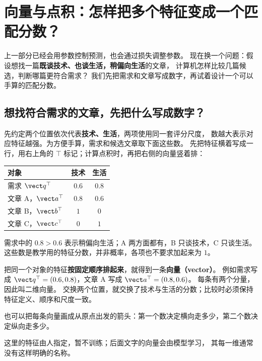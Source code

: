 \chapterrule
\section{向量与点积：怎样把多个特征变成一个匹配分数？}
\label{intro:01-vectors}
\label{intro:02-dot-product}

上一部分已经会用参数控制预测，也会通过损失调整参数。
现在换一个问题：假设想找一篇\textbf{既谈技术、也谈生活，稍偏向生活}的文章，
计算机怎样比较几篇候选，判断哪篇更符合需求？
我们先把需求和文章写成数字，再试着设计一个可以手算的匹配分数。

\subsection{想找符合需求的文章，先把什么写成数字？}

先约定两个位置依次代表\textbf{技术、生活}，两项使用同一套评分尺度，
数越大表示对应特征越强。为方便手算，需求和候选文章取下面这些数。
先把特征横着写成一行，用右上角的 $\top$ 标记；计算点积时，再把右侧的向量竖着排：
\begin{center}
\begin{tabular}{@{}lcc@{}}\toprule
对象 & 技术 & 生活\\\midrule
需求 $\vect q^\top$ & $0.6$ & $0.8$\\
文章 A，$\vect a^\top$ & $0.8$ & $0.6$\\
文章 B，$\vect b^\top$ & $1$ & $0$\\
文章 C，$\vect c^\top$ & $0$ & $1$\\\bottomrule
\end{tabular}
\end{center}
需求中的 $0.8>0.6$ 表示稍偏向生活；A 两方面都有，B 只谈技术，C 只谈生活。
这些数是教学用的特征分数，并非概率，各项也不要求加起来为 $1$。

\label{concept:vector}
把同一个对象的特征\textbf{按固定顺序排起来}，就得到一条\textbf{向量（vector）}。
例如需求写成 $\vect q^\top=(0.6,0.8)$，文章 A 写成 $\vect a^\top=(0.8,0.6)$。
每条有两个分量，因此叫二维向量。
交换两个位置，就交换了技术与生活的分数；比较时必须保持特征定义、顺序和尺度一致。

也可以把每条向量画成从原点出发的箭头：第一个数决定横向走多少，第二个数决定纵向走多少。


这里的特征由人指定，暂不训练；后面文字的向量会由模型学习，
其每一维通常没有这样明确的名称。
